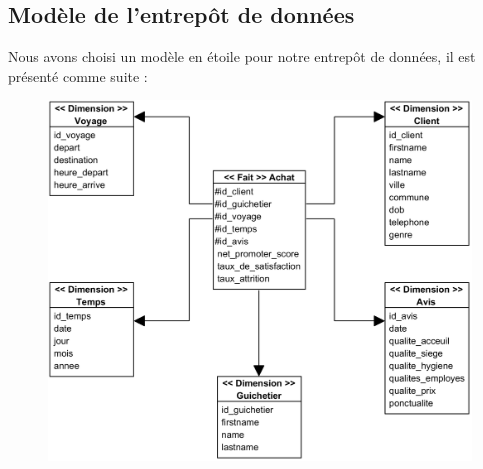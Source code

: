     \subsection[Modèle de l'entrepôt de données]{Modèle de l'entrepôt de données}
    Nous avons choisi un modèle en étoile pour notre entrepôt de données, il
    est présenté comme suite : 
        \begin{figure}[H]
            \centering
            \includegraphics[width=150mm]{images/datawarehous-schema/Entrepot de donnees Class Diagram.png}
            \label{fig:dataWarehouse}
        \end{figure}